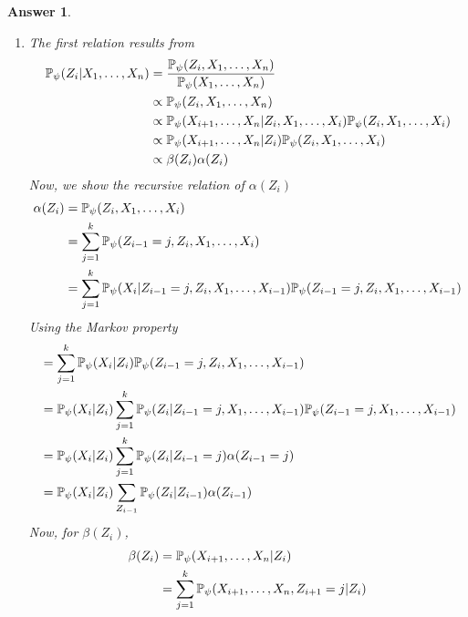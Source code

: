 \documentclass[12pt]{article}
\theoremstyle{colon}
\newtheorem*{answer}{Answer}
\begin{document}
\begin{answer}
\begin{enumerate}[label=\arabic*)]
    \item The first relation results from
      \begin{align*}
        \mathbb{P}_{\psi} (Z_i | X_1, \mathellipsis, X_n) &= \frac{\mathbb{P}_{\psi}(Z_i, X_1, \mathellipsis, X_n)}{\mathbb{P}_{\psi}(X_1, \mathellipsis, X_n)} \\
        &\propto \mathbb{P}_{\psi}(Z_i, X_1, \mathellipsis, X_n) \\
        &\propto \mathbb{P}_{\psi}(X_{i+1}, \mathellipsis, X_n | Z_i, X_1, \mathellipsis, X_i) \mathbb{P}_{\psi}(Z_i, X_1, \mathellipsis, X_i) \\
        &\propto \mathbb{P}_{\psi}(X_{i+1}, \mathellipsis, X_n | Z_i) \mathbb{P}_{\psi}(Z_i, X_1, \mathellipsis, X_i) \\
        &\propto \beta(Z_i) \alpha(Z_i)
      \end{align*}
      Now, we show the recursive relation of $\alpha(Z_i)$
      \begin{align*}
        \alpha(Z_i) &= \mathbb{P}_{\psi}(Z_i, X_1, \mathellipsis, X_i) \\
        &= \sum_{j=1}^k \mathbb{P}_{\psi}(Z_{i-1} = j, Z_i, X_1, \mathellipsis, X_i) \\
        &= \sum_{j=1}^k \mathbb{P}_{\psi}(X_i | Z_{i-1} = j, Z_i, X_1, \mathellipsis, X_{i-1}) \mathbb{P}_{\psi}(Z_{i-1} = j, Z_i, X_1, \mathellipsis, X_{i-1})
      \end{align*}
      Using the Markov property
      \begin{align*}
        &= \sum_{j=1}^k \mathbb{P}_{\psi}(X_i | Z_i) \mathbb{P}_{\psi}(Z_{i-1} = j, Z_i, X_1, \mathellipsis, X_{i-1}) \\
        &= \mathbb{P}_{\psi}(X_i | Z_i) \sum_{j=1}^k \mathbb{P}_{\psi}(Z_i | Z_{i-1} = j, X_1, \mathellipsis, X_{i-1}) \mathbb{P}_{\psi}(Z_{i-1} = j, X_1, \mathellipsis, X_{i-1}) \\
        &= \mathbb{P}_{\psi}(X_i | Z_i) \sum_{j=1}^k \mathbb{P}_{\psi}(Z_i | Z_{i-1} = j) \alpha(Z_{i-1} = j) \\
        &= \mathbb{P}_{\psi}(X_i | Z_i) \sum_{Z_{i-1}}\mathbb{P}_{\psi}(Z_i | Z_{i-1}) \alpha(Z_{i-1})
      \end{align*}
      Now, for $\beta(Z_i)$,
      \begin{align*}
        \beta(Z_i) &= \mathbb{P}_{\psi}(X_{i+1}, \mathellipsis, X_n | Z_i) \\
        &= \sum_{j=1}^k \mathbb{P}_{\psi}(X_{i+1}, \mathellipsis, X_n, Z_{i+1} = j | Z_i) \\

\end{align*}
\end{enumerate}
\end{answer}
\end{document}
